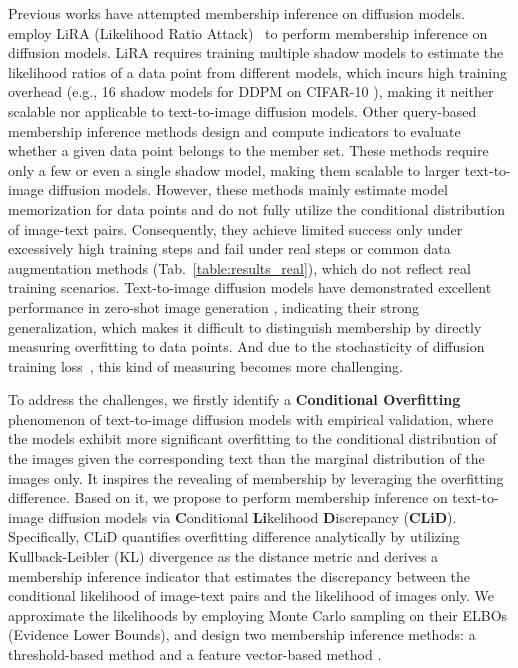 Previous works \cite{carlini2023extracting,duan2023diffusion,kong2023efficient,fu2023probabilistic,dubinski2024towards,matsumoto2023membership} have attempted membership inference on diffusion models. 
\citet{carlini2023extracting} employ LiRA (Likelihood Ratio Attack)~\cite{carlini2022membership} to perform membership inference on diffusion models. 
LiRA requires training multiple shadow models to estimate the likelihood ratios of a data point from different models, which incurs high training overhead (e.g., 16 shadow models for DDPM \cite{ho2020denoising} on CIFAR-10 \cite{krizhevsky2009learning}), making it neither scalable nor applicable to text-to-image diffusion models. Other query-based membership inference methods \cite{matsumoto2023membership,duan2023diffusion,kong2023efficient,fu2023probabilistic} design and compute indicators to evaluate whether a given data point belongs to the member set. These methods require only a few or even a single shadow model, making them scalable to larger text-to-image diffusion models. 
However, these methods mainly estimate model memorization for data points and do not fully utilize the conditional distribution of image-text pairs.
Consequently, they achieve limited success only under excessively high training steps and fail under real steps or common data augmentation methods (Tab.~\ref{table:results_real}), which do not reflect real training scenarios. 
Text-to-image diffusion models have demonstrated excellent performance in zero-shot image generation \cite{rombach2022high, podell2023sdxl,bao2023one}, indicating their strong generalization, which makes it difficult to distinguish membership by directly measuring overfitting to data points.  
And due to the stochasticity of diffusion training loss~\cite{ho2020denoising, rombach2022high}, this kind of measuring becomes more challenging.


To address the challenges, we firstly identify a \textbf{Conditional Overfitting} phenomenon of text-to-image diffusion models with empirical validation, where the models exhibit more significant overfitting to the conditional distribution of the images given the corresponding text than the marginal distribution of the images only. It inspires the revealing of membership by leveraging the overfitting difference.
Based on it, we propose to perform membership inference on text-to-image diffusion models via \textbf{C}onditional \textbf{Li}kelihood \textbf{D}iscrepancy (\textbf{CLiD}).
Specifically, CLiD quantifies overfitting difference analytically by utilizing Kullback-Leibler (KL) divergence as the distance metric and derives a membership inference indicator that estimates the discrepancy between the conditional likelihood of image-text pairs and the likelihood of images only. 
We approximate the likelihoods by employing Monte Carlo sampling on their ELBOs (Evidence Lower Bounds),
and design two membership inference methods: a threshold-based method \clidth and a feature vector-based method \clidvec.


